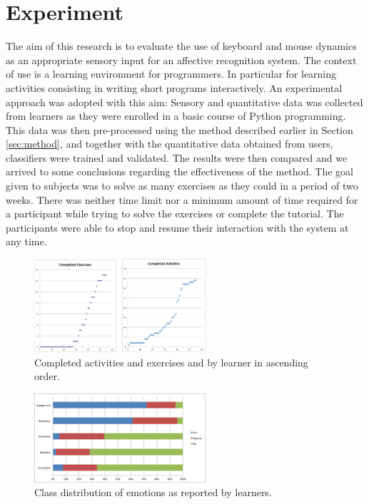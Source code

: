 \documentclass[a4paper]{llncs}
\begin{document}
\section{Experiment}
\label{sec:exp}
The aim of this research is to evaluate the use of keyboard
and mouse dynamics as an appropriate sensory input for an affective recognition
system. The context of use is a learning environment for programmers. In
particular for learning activities consisting in writing short programs
interactively. An experimental approach was adopted with this aim: Sensory and
quantitative data was collected from learners as they were enrolled in a basic
course of Python programming. This data was then pre-processed using the method
described earlier in Section \ref{sec:method}, and together with the quantitative data obtained from users,
classifiers were trained and validated. The results were then compared
and we arrived to some conclusions regarding the effectiveness of the method. The goal given to
subjects was to solve as many exercises as they could in a period of two weeks.
There was neither time limit nor a minimum amount of time required for a
participant while trying to solve the exercises or complete the tutorial. The
participants were able to stop and resume their interaction with the system at
any time.




\begin{figure}[!t] 
\centering 
\includegraphics[width=2.5in]{Completed.png} 
\caption{Completed activities and exercises and by learner in ascending order.}
\label{fig_completed} 
\end{figure}

\begin{figure}[!t] 
\centering 
\includegraphics[width=2.5in]{classDist.png} 
\caption{Class distribution of emotions as reported by learners.}
\label{fig_class} 
\end{figure}
\end{document}
